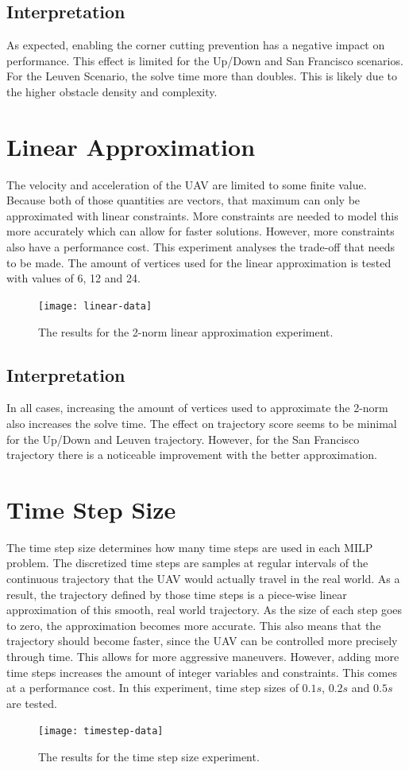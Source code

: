 \subsection{Interpretation}
As expected, enabling the corner cutting prevention has a negative impact on performance. This effect is limited for the Up/Down and San  Francisco scenarios. For the Leuven Scenario, the solve time more than doubles. This is likely due to the higher obstacle density and complexity.


\clearpage
\section{Linear Approximation}
\label{subsec:lin-approx}
The velocity and acceleration of the UAV are limited to some finite value. Because both of those quantities are vectors, that maximum can only be approximated with linear constraints. More constraints are needed to model this more accurately which can allow for faster solutions. However, more constraints also have a performance cost. This experiment analyses the trade-off that needs to be made. The amount of vertices used for the linear approximation is tested with values of 6, 12 and 24.
\begin{figure}[]
	\centering
	\texttt{[image: linear-data]}
	\caption{The results for the 2-norm linear approximation experiment.}
	\label{fig:linear-approx-data}
\end{figure}



\subsection{Interpretation}
In all cases, increasing the amount of vertices used to approximate the 2-norm also increases the solve time. The effect on trajectory score seems to be minimal for the Up/Down and Leuven trajectory. However, for the San Francisco trajectory there is a noticeable improvement with the better approximation.

\clearpage
\section{Time Step Size}
\label{subsec:timestep}
The time step size determines how many time steps are used in each MILP problem. The discretized time steps are samples at regular intervals of the continuous trajectory that the UAV would actually travel in the real world. As a result, the trajectory defined by those time steps is a piece-wise linear approximation of this smooth, real world trajectory. As the size of each step goes to zero, the approximation becomes more accurate. This also means that the trajectory should become faster, since the UAV can be controlled more precisely through time. This allows for more aggressive maneuvers. 
However, adding more time steps increases the amount of integer variables and constraints. This comes at a performance cost.
In this experiment, time step sizes of $0.1s$, $0.2s$ and $0.5s$ are tested.
\begin{figure}[]
	\centering
	\texttt{[image: timestep-data]}
	\caption{The results for the time step size experiment.}
	\label{fig:timestep-data}
\end{figure}
